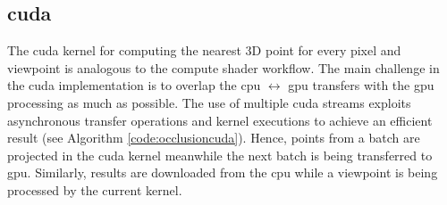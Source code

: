 \subsection{\acrshort{cuda}}

The \acrshort{cuda} kernel for computing the nearest 3D point for every pixel and viewpoint is analogous to the compute shader workflow. The main challenge in the \acrshort{cuda} implementation is to overlap the \acrshort{cpu} $\leftrightarrow$ \acrshort{gpu} transfers with the \acrshort{gpu} processing as much as possible. The use of multiple \acrshort{cuda} streams exploits asynchronous transfer operations and kernel executions to achieve an efficient result (see Algorithm \ref{code:occlusioncuda}). Hence, points from a batch are projected in the \acrshort{cuda} kernel meanwhile the next batch is being transferred to \acrshort{gpu}. Similarly, results are downloaded from the \acrshort{cpu} while a viewpoint is being processed by the current kernel.

\newpage


